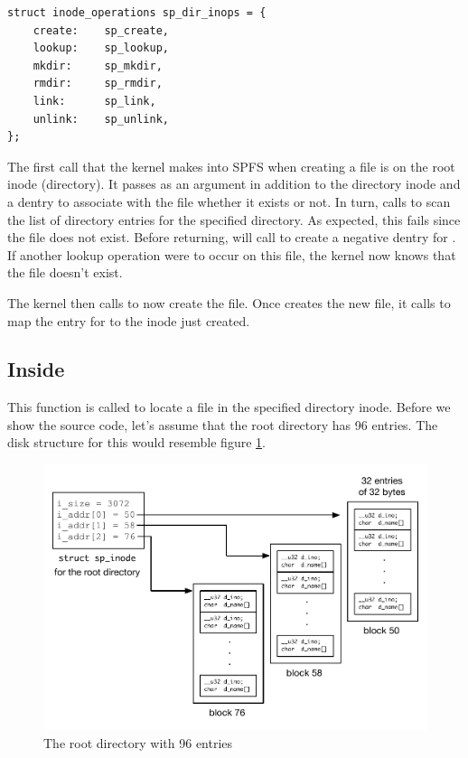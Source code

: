 \begin{lstlisting}
struct inode_operations sp_dir_inops = {
    create:    sp_create,
    lookup:    sp_lookup,
    mkdir:     sp_mkdir,
    rmdir:     sp_rmdir,
    link:      sp_link,
    unlink:    sp_unlink,
};
\end{lstlisting}

\noindent
The first call that the kernel makes into SPFS when creating a file is  on the root inode (directory). It passes  as an argument in addition to the directory inode and a dentry to associate with the file whether it exists or not. In turn,  calls  to scan the list of directory entries for the specified directory. As expected, this fails since the file does not exist. Before returning,  will call  to create a negative dentry for . If another lookup operation were to occur on this file, the kernel now knows that the file doesn't exist. 

The kernel then calls  to now create the file. Once  creates the new file, it calls  to map the entry for  to the inode just created.


\subsection{Inside }

This function is called to locate a file in the specified directory  inode. Before we show the source code, let's assume that the root directory has 96 entries. The disk structure for this would resemble figure \ref{fig:sp-filldir}.

\begin{figure}
	\includegraphics[scale=0.6]{figures/sp-filldir.pdf}
	\centering
	\caption{The root directory with 96 entries}
	\label{fig:sp-filldir}
\end{figure}

